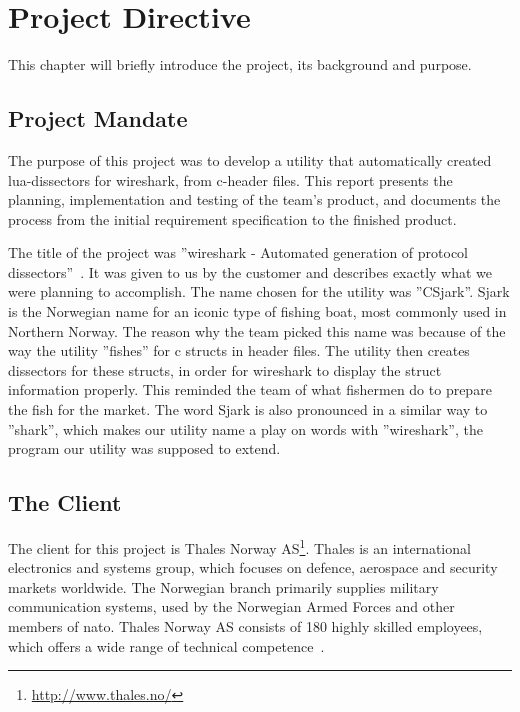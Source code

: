 \chapter{Project Directive}
This chapter will briefly introduce the project, its background and purpose.


\section{Project Mandate}
The purpose of this project was to develop a \gls{utility} that automatically created \Gls{lua}-\glspl{dissector} for \Gls{wireshark}, from \Gls{c}-\gls{header} files. This report presents the planning, implementation
 and testing of the team’s product, and documents the process from the initial requirement specification to the finished product. 

The title of the project was ''\Gls{wireshark} - Automated generation of \gls{protocol} \glspl{dissector}''~\cite{Compendium}.
It was given to us by the customer and describes exactly what we were planning to accomplish. The name chosen for the \gls{utility} was ''CSjark''. Sjark is the Norwegian name for an iconic type of fishing boat, most commonly used in Northern Norway. The reason why the team picked this name was because of the way the \gls{utility} ''fishes'' for \Gls{c} \glspl{struct} in \gls{header} files. The \gls{utility} then creates \glspl{dissector} for these \glspl{struct}, in order for \Gls{wireshark} to display the \gls{struct} information properly. This reminded the team of what fishermen do to prepare the fish for the market. The word Sjark is also pronounced in a similar way to ''shark'', which makes our \gls{utility} name a play on words with ''\Gls{wireshark}'', the program our \gls{utility} was supposed to extend.


\section{The Client}
The client for this project is
Thales Norway AS\footnote{\url{http://www.thales.no/}}. Thales is an
international electronics and systems group, which focuses on defence,
aerospace and security markets worldwide. The Norwegian branch primarily
supplies military communication systems, used by the Norwegian Armed Forces
and other members of \Gls{nato}. Thales Norway AS consists of 180 highly skilled
employees, which offers a wide range of technical competence~\cite{ThalesNO}.
	
